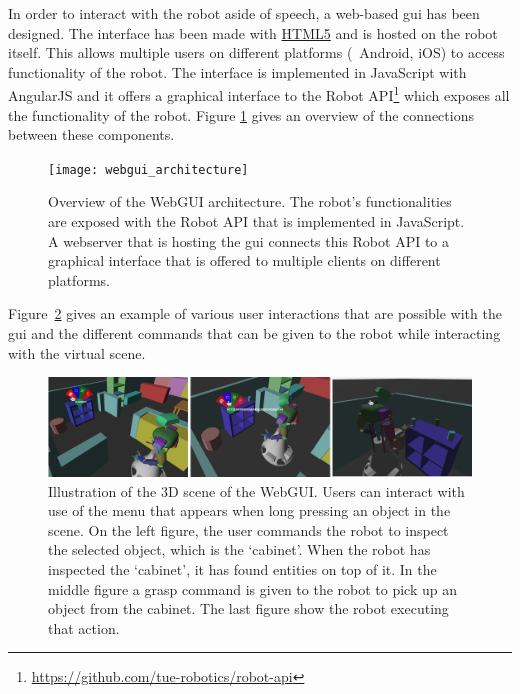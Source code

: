 In order to interact with the robot aside of speech, a web-based \gls{gui} has been designed.
The interface has been made with \href{https://github.com/tue-robotics/tue\_mobile\_ui}{HTML5} and is hosted on the robot itself.
This allows multiple users on different platforms (\eg\ Android, iOS) to access functionality of the robot. The interface is implemented in JavaScript with AngularJS and it offers a graphical interface to the Robot API\footnote{\url{https://github.com/tue-robotics/robot-api}} which exposes all the functionality of the robot.
Figure \ref{fig:webgui_architecture} gives an overview of the connections between these components.
\begin{figure}[h]
    \centering
	\texttt{[image: webgui\_architecture]}
	\caption{
		Overview of the WebGUI architecture.
		The robot's functionalities are exposed with the Robot API that is implemented in JavaScript.
		A webserver that is hosting the \protect\gls{gui} connects this Robot API to a graphical interface that is offered to multiple clients on different platforms.}
	\label{fig:webgui_architecture}
\end{figure}
Figure~\ref{fig:gui_actions} gives an example of various user interactions that are possible with the \gls{gui} and the different commands that can be given to the robot while interacting with the virtual scene.

\begin{figure}[H]
	\includegraphics[width=\linewidth]{Figures/gui_actions}
	\caption{
		Illustration of the 3D scene of the WebGUI.
		Users can interact with use of the menu that appears when long pressing an object in the scene.
		On the left figure, the user commands the robot to inspect the selected object, which is the `cabinet'.
		When the robot has inspected the `cabinet', it has found entities on top of it.
		In the middle figure a grasp command is given to the robot to pick up an object from the cabinet.
		The last figure show the robot executing that action.}
	\label{fig:gui_actions}
\end{figure}
